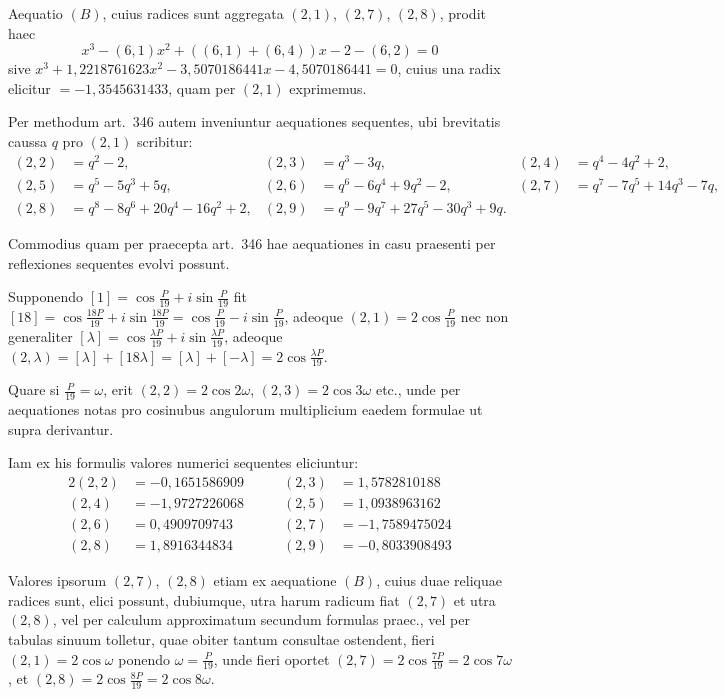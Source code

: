 \documentclass[12pt,a4paper]{article}
\theoremstyle{plain}
\theoremstyle{definition}
\theoremstyle{remark}
\begin{document}
Aequatio $(B)$, cuius radices sunt aggregata $(2,1)$, $(2,7)$, $(2,8)$, prodit haec
\[x^3-(6,1)x^2+((6,1)+(6,4))x-2-(6,2)=0\]
sive $x^3+1{,}2218761623x^2-3{,}5070186441x-4{,}5070186441=0$, cuius una radix elicitur $=-1{,}3545631433$, quam per $(2,1)$ exprimemus.

Per methodum art.\ 346 autem inveniuntur aequationes sequentes, ubi brevitatis caussa $q$ pro $(2,1)$ scribitur:
\begin{align*}
(2,2)&=q^2-2, & (2,3)&=q^3-3q, & (2,4)&=q^4-4q^2+2,\\
(2,5)&=q^5-5q^3+5q, & (2,6)&=q^6-6q^4+9q^2-2, & (2,7)&=q^7-7q^5+14q^3-7q,\\
(2,8)&=q^8-8q^6+20q^4-16q^2+2, & (2,9)&=q^9-9q^7+27q^5-30q^3+9q.
\end{align*}

Commodius quam per praecepta art.\ 346 hae aequationes in casu praesenti per reflexiones sequentes evolvi possunt.

Supponendo $[1]=\cos\frac{P}{19}+i\sin\frac{P}{19}$ fit $[18]=\cos\frac{18P}{19}+i\sin\frac{18P}{19}=\cos\frac{P}{19}-i\sin\frac{P}{19}$, adeoque $(2,1)=2\cos\frac{P}{19}$ nec non generaliter $[\lambda]=\cos\frac{\lambda P}{19}+i\sin\frac{\lambda P}{19}$, adeoque $(2,\lambda)=[\lambda]+[18\lambda]=[\lambda]+[-\lambda]=2\cos\frac{\lambda P}{19}$.

Quare si $\frac{P}{19}=\omega$, erit $(2,2)=2\cos 2\omega$, $(2,3)=2\cos 3\omega$ etc., unde per aequationes notas pro cosinubus angulorum multiplicium eaedem formulae ut supra derivantur.

Iam ex his formulis valores numerici sequentes eliciuntur:
\begin{alignat*}{2}
(2,2)&=-0{,}1651586909\qquad & (2,3)&=1{,}5782810188\\
(2,4)&=-1{,}9727226068 & (2,5)&=1{,}0938963162\\
(2,6)&=0{,}4909709743 & (2,7)&=-1{,}7589475024\\
(2,8)&=1{,}8916344834 & (2,9)&=-0{,}8033908493
\end{alignat*}

Valores ipsorum $(2,7)$, $(2,8)$ etiam ex aequatione $(B)$, cuius duae reliquae radices sunt, elici possunt, dubiumque, utra harum radicum fiat $(2,7)$ et utra $(2,8)$, vel per calculum approximatum secundum formulas praec., vel per tabulas sinuum tolletur, quae obiter tantum consultae ostendent, fieri $(2,1)=2\cos\omega$ ponendo $\omega=\frac{P}{19}$, unde fieri oportet $(2,7)=2\cos\frac{7P}{19}=2\cos 7\omega$, et $(2,8)=2\cos\frac{8P}{19}=2\cos 8\omega$.
\end{document}
